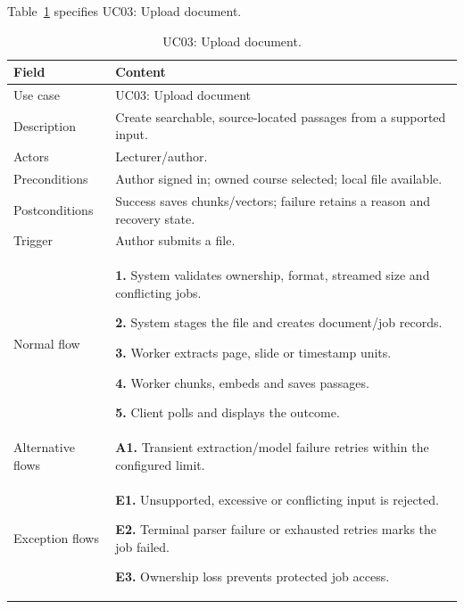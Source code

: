 \needspace{.39\textheight}
Table~\ref{tab:uc-03} specifies UC03: Upload document.
\begin{table}[H]\centering\footnotesize{}\renewcommand{\arraystretch}{1.05}
\caption{UC03: Upload document.}\label{tab:uc-03}
\begin{tabular}{|p{2.8cm}|p{11.9cm}|}\hline
\textbf{Field} & \textbf{Content}\\\hline
Use case & UC03: Upload document\\\hline
Description & Create searchable, source-located passages from a supported input.\\\hline
Actors & Lecturer/author.\\\hline
Preconditions & Author signed in; owned course selected; local file available.\\\hline
Postconditions & Success saves chunks/vectors; failure retains a reason and recovery state.\\\hline
Trigger & Author submits a file.\\\hline
Normal flow & \textbf{1.} System validates ownership, format, streamed size and conflicting jobs.\par \textbf{2.} System stages the file and creates document/job records.\par \textbf{3.} Worker extracts page, slide or timestamp units.\par \textbf{4.} Worker chunks, embeds and saves passages.\par \textbf{5.} Client polls and displays the outcome.\\\hline
Alternative flows & \textbf{A1.} Transient extraction/model failure retries within the configured limit.\\\hline
Exception flows & \textbf{E1.} Unsupported, excessive or conflicting input is rejected.\par \textbf{E2.} Terminal parser failure or exhausted retries marks the job failed.\par \textbf{E3.} Ownership loss prevents protected job access.\\\hline
\end{tabular}\end{table}

